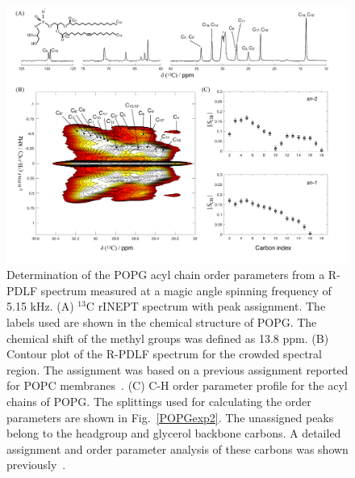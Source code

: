 \documentclass[fleqn,10pt]{wlscirep}
\begin{document}
\begin{figure}[p]
  \includegraphics[width=\textwidth]{Figures/POPG_INEPT_contour_SCH.pdf}
  \caption{Determination of the POPG acyl chain order parameters from a R-PDLF spectrum measured at a magic angle spinning frequency of 5.15 kHz. (A) $^{13}$C rINEPT spectrum with peak assignment. The labels used are shown in the chemical structure of POPG. The chemical shift of the methyl groups was defined as 13.8 ppm. (B) Contour plot of the R-PDLF spectrum for the crowded spectral region. The assignment was based on a previous assignment reported for POPC membranes~\cite{ferreira13}. (C) C-H order parameter profile for the acyl chains of POPG. The splittings used for calculating the order parameters are shown in Fig.~\ref{POPGexp2}. The unassigned peaks belong to the headgroup and glycerol backbone carbons. A detailed assignment and order parameter analysis of these carbons was shown previously~\cite{bacle21}.}
  \label{POPGexp1}
\end{figure}
\end{document}
